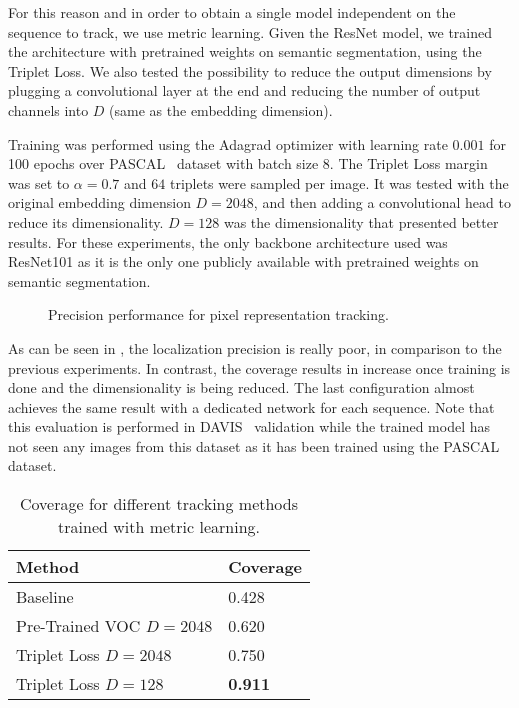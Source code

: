 For this reason and in order to obtain a single model independent on the sequence to track, we use metric learning.
Given the ResNet model, we trained the architecture with pretrained weights on semantic segmentation, using the Triplet Loss.
We also tested the possibility to reduce the output dimensions by plugging a convolutional layer at the end and reducing the number of output channels into $D$ (same as the embedding dimension).

Training was performed using the Adagrad optimizer with learning rate $0.001$ for 100 epochs over PASCAL~\pascal{} dataset with batch size $8$.
The Triplet Loss margin was set to $\alpha = 0.7$ and $64$ triplets were sampled per image.
It was tested with the original embedding dimension $D=2048$, and then adding a convolutional head to reduce its dimensionality.
$D=128$ was the dimensionality that presented better results.
For these experiments, the only backbone architecture used was ResNet101 as it is the only one publicly available with pretrained weights on semantic segmentation.


\begin{figure}[h]
  \centering
  
  \caption{Precision performance for pixel representation tracking.}
  \label{fig:experiments:tracking:metriclearning}
\end{figure}

As can be seen in , the localization precision is really poor, in comparison to the previous experiments.
In contrast, the coverage results in  increase once training is done and the dimensionality is being reduced. The last configuration almost achieves the same result with a dedicated network for each sequence.
Note that this evaluation is performed in DAVIS~\davislast{} validation while the trained model has not seen any images from this dataset as it has been trained using the PASCAL~\pascal{} dataset.


\begin{table}[h]
  \centering
  \begin{tabular}{l|l}
    \toprule
    Method                   & Coverage       \\
    \midrule
    Baseline                 & 0.428          \\
    Pre-Trained VOC $D=2048$ & 0.620          \\
    Triplet Loss $D=2048$    & 0.750          \\
    Triplet Loss $D=128$     & \textbf{0.911} \\
    \bottomrule
  \end{tabular}
  \caption{Coverage for different tracking methods trained with metric learning. }
  \label{tab:experiments:tracking:coveragemetriclearning}
\end{table}

